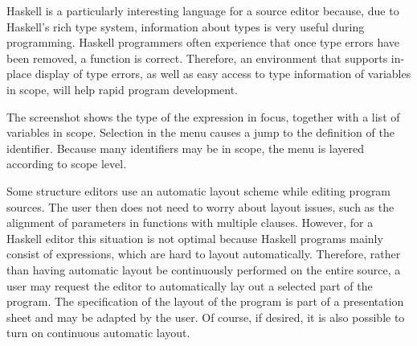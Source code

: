 
Haskell is a particularly interesting language for a source editor because, due to Haskell's rich type system, information about types is very useful during programming. Haskell programmers often experience that once type errors have been removed, a function is correct. Therefore, an environment that supports in-place display of type errors, as well as easy access to type information of variables in scope, will help rapid program development. 

The screenshot shows the type of the expression in focus, together with a list of variables in scope. Selection in the menu causes a jump to the definition of the identifier. Because many identifiers may be in scope, the menu is layered according to scope level. 

%


Some structure editors use an automatic layout scheme while editing program sources. The user then does not need to worry about layout issues, such as the alignment of parameters in functions with multiple clauses. However, for a Haskell editor this situation is not optimal because Haskell programs mainly consist of expressions, which are hard to layout automatically. Therefore, rather than having automatic layout be continuously performed on the entire source, a user may request the editor to automatically lay out a selected part of the program. The specification of the layout of the program is part of a presentation sheet and may be adapted by the user. Of course, if desired, it is also possible to turn on continuous automatic layout.

